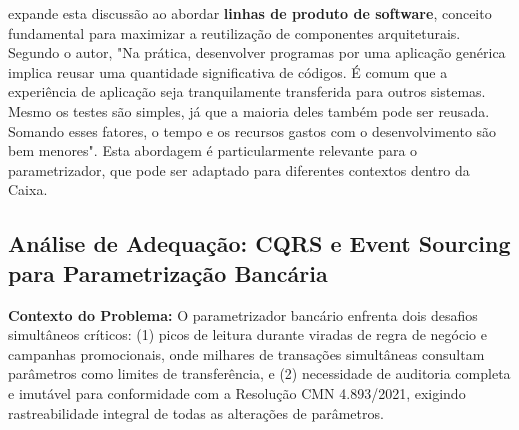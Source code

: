  expande esta discussão ao abordar \textbf{linhas de produto de software}, conceito fundamental para maximizar a reutilização de componentes arquiteturais. Segundo o autor, "Na prática, desenvolver programas por uma aplicação genérica implica reusar uma quantidade significativa de códigos. É comum que a experiência de aplicação seja tranquilamente transferida para outros sistemas. Mesmo os testes são simples, já que a maioria deles também pode ser reusada. Somando esses fatores, o tempo e os recursos gastos com o desenvolvimento são bem menores". Esta abordagem é particularmente relevante para o parametrizador, que pode ser adaptado para diferentes contextos dentro da Caixa.

\subsection{Análise de Adequação: CQRS e Event Sourcing para Parametrização Bancária}

\textbf{Contexto do Problema:} O parametrizador bancário enfrenta dois desafios simultâneos críticos: (1) picos de leitura durante viradas de regra de negócio e campanhas promocionais, onde milhares de transações simultâneas consultam parâmetros como limites de transferência, e (2) necessidade de auditoria completa e imutável para conformidade com a Resolução CMN 4.893/2021, exigindo rastreabilidade integral de todas as alterações de parâmetros.

